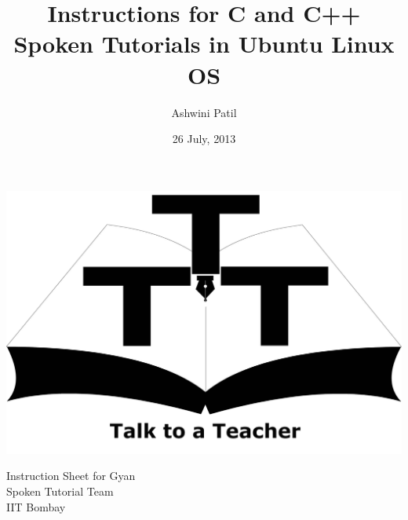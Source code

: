 \documentclass[11pt]{article}
\title{Instructions for C and C++ \\
  Spoken Tutorials in Ubuntu Linux OS}
\author{Ashwini Patil}
\date{26 July, 2013}
\begin{document}
\begin{minipage}[t]{0.15\textwidth}
  \includegraphics[width=\linewidth]{3t-logo.pdf}
\end{minipage} \hfill
\begin{minipage}[t]{0.65\textwidth}
  \begin{center}
	\vspace{-0.7in}
	\Large
	Instruction Sheet for Gyan \\
	\large
	Spoken Tutorial Team \\
	IIT Bombay
  \end{center}
\end{minipage} \hfill
\begin{minipage}[t]{0.12\textwidth}

\end{minipage}
\end{document}

